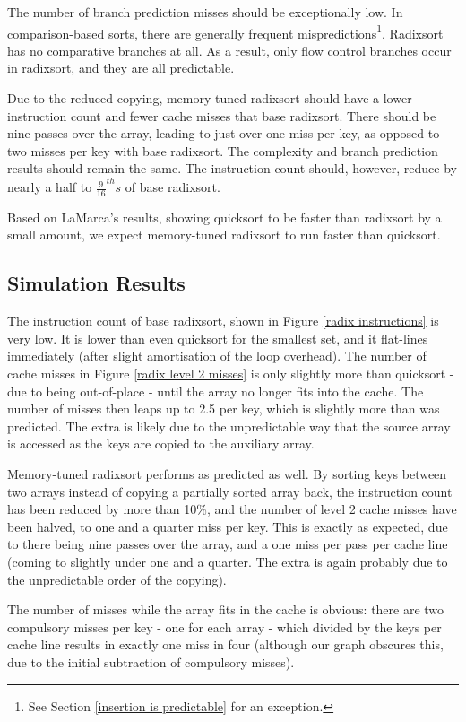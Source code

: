 The number of branch prediction misses should be exceptionally low. In
comparison-based sorts, there are generally frequent mispredictions\footnote{See
Section \ref{insertion is predictable} for an exception.}. Radixsort has no
comparative branches at all. As a result, only flow control branches occur in
radixsort, and they are all predictable.

Due to the reduced copying, memory-tuned radixsort should have a lower
instruction count and fewer cache misses that base radixsort. There should be
nine passes over the array, leading to just over one miss per key, as opposed to
two misses per key with base radixsort. The complexity and branch prediction
results should remain the same. The instruction count should, however, reduce by
nearly a half to $\frac{9}{16}^{th}s$ of base radixsort.

Based on LaMarca's results, showing quicksort to be faster than radixsort by a
small amount, we expect memory-tuned radixsort to run faster than quicksort.

\subsection{Simulation Results}

The instruction count of base radixsort, shown in Figure \ref{radix
instructions} is very low. It is lower than even quicksort for the smallest set,
and it flat-lines immediately (after slight amortisation of the loop overhead).
The number of cache misses in Figure \ref{radix level 2 misses} is only slightly
more than quicksort - due to being out-of-place - until the array no longer fits
into the cache. The number of misses then leaps up to 2.5 per key, which is
slightly more than was predicted. The extra is likely due to the unpredictable
way that the source array is accessed as the keys are copied to the auxiliary
array.

Memory-tuned radixsort performs as predicted as well. By sorting keys between two
arrays instead of copying a partially sorted array back, the instruction count
has been reduced by more than 10\%, and the number of level 2 cache misses
have been halved, to one and a quarter miss per key. This is exactly
as expected, due to there being nine passes over the array, and a one miss
per pass per cache line (coming to slightly under one and a quarter. The extra
is again probably due to the unpredictable order of the copying).

The number of misses while the array fits in the cache is obvious: there
are two compulsory misses per key - one for each array - which divided by the
keys per cache line results in exactly one miss in four (although our graph
obscures this, due to the initial subtraction of compulsory misses).

